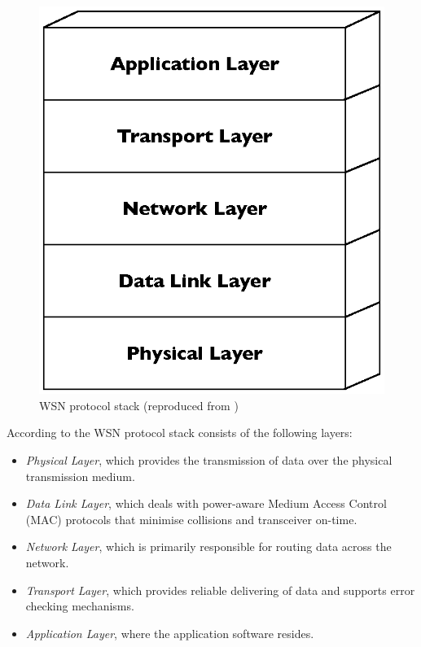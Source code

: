 \begin{figure}[h]
\centering
\includegraphics[scale=0.65]{img/ProtStack.eps}
\caption[WSN protocol stack]{WSN protocol stack (reproduced from \cite{SensorSurveyAkyildiz:2002})}
\label{Fig:ProtStack}
\end{figure}

According to \cite{SensorSurveyAkyildiz:2002} the WSN protocol stack consists
of the following layers:

\begin{itemize}
\item \emph{Physical Layer}, which provides the transmission of data over the physical transmission medium.
\item \emph{Data Link Layer}, which deals with power-aware Medium Access Control (MAC) protocols that minimise collisions and transceiver on-time.
\item \emph{Network Layer}, which is primarily responsible for
routing data across the network.
\item \emph{Transport Layer}, which provides reliable delivering of data and
supports error checking mechanisms.
\item \emph{Application Layer}, where the application software resides.
\end{itemize}



